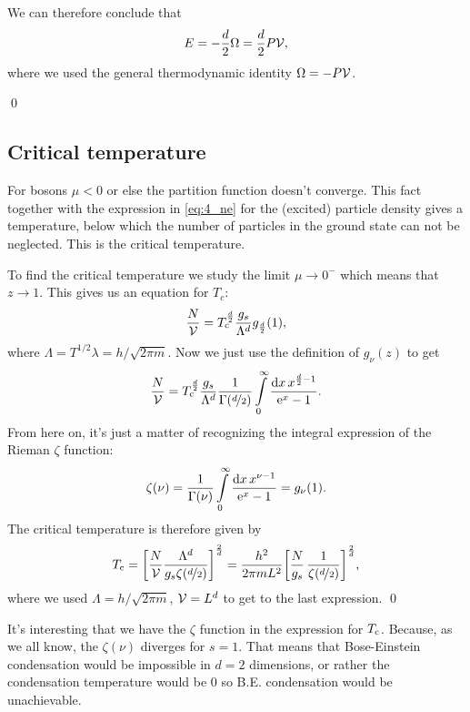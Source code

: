 \documentclass[11pt,letter, swedish, english
]{article}
\begin{document}
We can therefore conclude that
\begin{equation}\label{eq:4_E_Omega_PV}
E=-\frac{d}{2}\Omega=\frac{d}{2}P\mathcal{V},
\end{equation}
where we used the general thermodynamic identity $\Omega=-P\mathcal{V}$.

\qed


\subsection{Critical temperature}

For bosons $\mu<0$ or else the partition function doesn't
converge. This fact together with the expression in \eqref{eq:4_ne}
for the (excited) particle density gives a temperature, below which
the number of particles in the ground state can not be neglected. This
is the critical temperature. 

To find the critical temperature we study the limit $\mu\to0^-$ which
means that $z\to1$. This gives us an equation for $T_c$:
\begin{equation}
\frac{N}{\mathcal{V}}= T_{\text{c}}^{\frac{d}{2}}
\frac{g_s}{\Lambda^d} g_{\frac{d}{2}}(1),
\end{equation}
where $\Lambda=T^{1/2}\lambda=h/\sqrt{2\pi m}$. Now we just use the
definition of $g_\nu(z)$ to get
\begin{equation}
\frac{N}{\V}= \Tc^{\D{2}}
\frac{g_s}{\Lambda^d} 
\frac{1}{\Gamma(\nD{2})}
\int_0^\infty\frac{\rd{x}\, x^{\D{2}-1}}{\ee^{x}-1}.
\end{equation}
From here on, it's just a matter of recognizing the integral expression
of the Rieman $\zeta$ function:
\begin{equation}\label{eq:4_zeta}
\zeta(\nu)=\frac{1}{\Gamma(\nu)}\int_0^\infty
\frac{\rd{x}\,x^{\nu-1}}{\ee^{x}-1}
=g_\nu(1).
\end{equation}
The critical temperature is therefore given by
\begin{equation}
T_{\text{c}}=\qty[\frac{N}{\mathcal{V}}
\frac{\Lambda^d}{g_s\zeta(\nicefrac{d}{2})}
]^{\frac{2}{d}}
=\frac{h^2}{2\pi m L^2} \qty[
\frac{N}{g_s}\,\frac{1}
{\zeta(\nicefrac{d}{2})}
]^{\frac{2}{d}},
\end{equation}
where we used $\Lambda=h/\sqrt{2\pi m}$, $\mathcal{V}=L^d$ 
to get to the last expression. \qed

It's interesting that we have the $\zeta$ function in the expression
for $T_{\text{c}}$. Because, as we all know, the $\zeta(\nu)$ diverges for
$s=1$. That means that Bose-Einstein condensation would be impossible
in $d=2$ dimensions, or rather the condensation temperature would be
$0$ so B.E. condensation would be unachievable.
\end{document}
